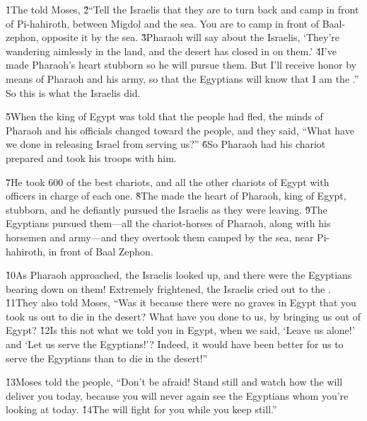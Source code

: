 \v{1}The  told Moses, \v{2}``Tell the Israelis that they are to turn back and camp in front of Pi-hahiroth, between Migdol and the sea. You are to camp in front of Baal-zephon, opposite it by the sea. \v{3}Pharaoh will say about the Israelis, `They're wandering aimlessly in the land, and the desert has closed in on them.' \v{4}I've made Pharaoh's heart stubborn so he will pursue them. But I'll receive honor by means of Pharaoh and his army, so that the Egyptians will know that I am the .'' So this is what the Israelis did.

\v{5}When the king of Egypt was told that the people had fled, the minds of Pharaoh and his officials changed toward the people, and they said, ``What have we done in releasing Israel from serving us?'' \v{6}So Pharaoh had his chariot prepared and took his troops with him.

\v{7}He took 600 of the best chariots, and all the other chariots of Egypt with officers in charge of each one. \v{8}The  made the heart of Pharaoh, king of Egypt, stubborn, and he defiantly pursued the Israelis as they were leaving. \v{9}The Egyptians pursued them---all the chariot-horses of Pharaoh, along with his horsemen and army---and they overtook them camped by the sea, near Pi-hahiroth, in front of Baal Zephon.

\v{10}As Pharaoh approached, the Israelis looked up, and there were the Egyptians bearing down on them! Extremely frightened, the Israelis cried out to the . \v{11}They also told Moses, ``Was it because there were no graves in Egypt that you took us out to die in the desert? What have you done to us, by bringing us out of Egypt? \v{12}Is this not what we told you in Egypt, when we said, `Leave us alone!' and `Let us serve the Egyptians!'? Indeed, it would have been better for us to serve the Egyptians than to die in the desert!''

\v{13}Moses told the people, ``Don't be afraid! Stand still and watch how the  will deliver you today, because you will never again see the Egyptians whom you're looking at today. \v{14}The  will fight for you while you keep still.''

